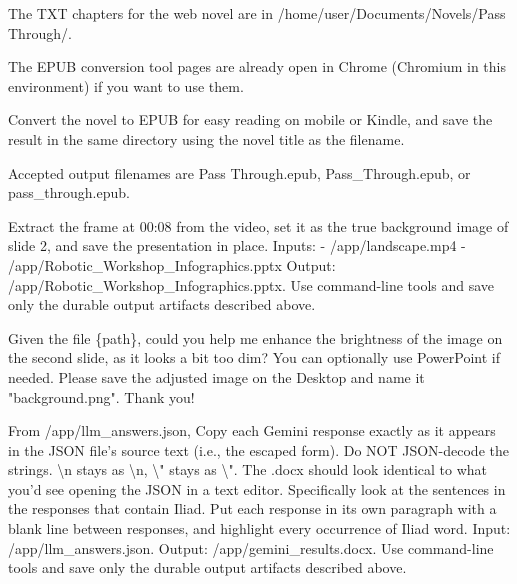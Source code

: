 \begin{instructionbox}
The TXT chapters for the web novel are in \textasciigrave{}/home/user/Documents/Novels/Pass Through/\textasciigrave{}.

The EPUB conversion tool pages are already open in Chrome (Chromium in this environment) if you want to use them.

Convert the novel to EPUB for easy reading on mobile or Kindle, and save the result in the same directory using the novel title as the filename.

Accepted output filenames are \textasciigrave{}Pass Through.epub\textasciigrave{}, \textasciigrave{}Pass\_Through.epub\textasciigrave{}, or \textasciigrave{}pass\_through.epub\textasciigrave{}.
\end{instructionbox}

\begin{instructionbox}
Extract the frame at \textasciigrave{}00:08\textasciigrave{} from the video, set it as the true background image of slide 2, and save the presentation in place.
Inputs:
- \textasciigrave{}/app/landscape.mp4\textasciigrave{}
- \textasciigrave{}/app/Robotic\_Workshop\_Infographics.pptx\textasciigrave{}
Output: \textasciigrave{}/app/Robotic\_Workshop\_Infographics.pptx\textasciigrave{}.
Use command-line tools and save only the durable output artifacts described above.
\end{instructionbox}

\begin{instructionbox}
Given the file \{path\}, could you help me enhance the brightness of the image on the second slide, as it looks a bit too dim? You can optionally use PowerPoint if needed. Please save the adjusted image on the Desktop and name it "background.png". Thank you!
\end{instructionbox}

\begin{instructionbox}
From \textasciigrave{}/app/llm\_answers.json\textasciigrave{}, Copy each Gemini response exactly as it appears in the JSON file's source text (i.e., the escaped form). Do NOT JSON-decode the strings. \textbackslash{}n stays as \textbackslash{}n, \textbackslash{}" stays as \textbackslash{}". The .docx should look identical to what you'd see opening the JSON in a text editor. 
Specifically look at the sentences in the responses that contain \textasciigrave{}Iliad\textasciigrave{}.
Put each response in its own paragraph with a blank line between responses, and highlight every occurrence of \textasciigrave{}Iliad\textasciigrave{} word.
Input: \textasciigrave{}/app/llm\_answers.json\textasciigrave{}.
Output: \textasciigrave{}/app/gemini\_results.docx\textasciigrave{}.
Use command-line tools and save only the durable output artifacts described above.
\end{instructionbox}

